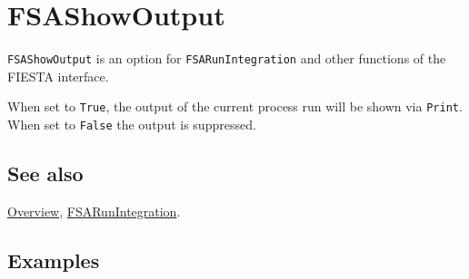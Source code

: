 \documentclass[../FeynHelpersManual.tex]{subfiles}
\begin{document}
\begin{Shaded}
\begin{Highlighting}[]
 
\end{Highlighting}
\end{Shaded}

\hypertarget{fsashowoutput}{
\section{FSAShowOutput}\label{fsashowoutput}}

\texttt{FSAShowOutput} is an option for \texttt{FSARunIntegration} and
other functions of the FIESTA interface.

When set to \texttt{True}, the output of the current process run will be
shown via \texttt{Print}. When set to \texttt{False} the output is
suppressed.

\subsection{See also}

\hyperlink{toc}{Overview},
\hyperlink{fsarunintegration}{FSARunIntegration}.

\subsection{Examples}
\end{document}
